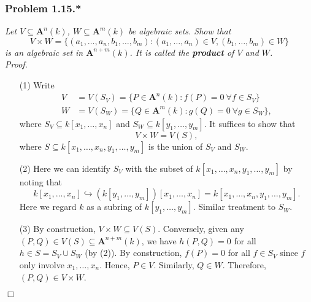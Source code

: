 \documentclass{article}
\begin{document}



\subsubsection*{Problem 1.15.*}
\emph{Let $V \subseteq \mathbf{A}^n(k)$, $W \subseteq \mathbf{A}^m(k)$ be algebraic sets.
Show that
\[
  V \times W
  = \{(a_1,\ldots,a_n,b_1,\ldots,b_m) : (a_1,\ldots,a_n) \in V, (b_1,\ldots,b_m) \in W \}
\]
is an algebraic set in $\mathbf{A}^{n+m}(k)$.
It is called the \textbf{product} of $V$ and $W$.} \\

\emph{Proof.}
\begin{enumerate}
\item[(1)]
  Write
  \begin{align*}
    V &= V(S_V) = \{ P \in \mathbf{A}^n(k) : f(P) = 0 \: \forall f \in S_V \} \\
    W &= V(S_W) = \{ Q \in \mathbf{A}^m(k) : g(Q) = 0 \: \forall g \in S_W \},
  \end{align*}
  where $S_V \subseteq k[x_1,\ldots,x_n]$ and $S_W \subseteq k[y_1,\ldots,y_m]$.
  It suffices to show that
  \[
    V \times W = V(S),
  \]
  where
  $S \subseteq k[x_1,\ldots,x_n,y_1,\ldots,y_m]$ is the union of $S_V$ and $S_W$.

\item[(2)]
  Here we can identify $S_V$ with the subset of
  $k[x_1,\ldots,x_n,y_1,\ldots,y_m]$
  by noting that
  \[
    k[x_1,\ldots,x_n]
    \hookrightarrow (k[y_1,\ldots,y_m])[x_1,\ldots,x_n]
    = k[x_1,\ldots,x_n,y_1,\ldots,y_m].
  \]
  Here we regard $k$ as a subring of $k[y_1,\ldots,y_m]$.
  Similar treatment to $S_W$.

\item[(3)]
  By construction, $V \times W \subseteq V(S)$.
  Conversely, given any $(P,Q) \in V(S) \subseteq \mathbf{A}^{n+m}(k)$,
  we have $h(P,Q) = 0$ for all $h \in S = S_V \cup S_W$ (by (2)).
  By construction, $f(P) = 0$ for all $f \in S_V$ since $f$ only involve $x_1,\ldots,x_n$.
  Hence, $P \in V$. Similarly, $Q \in W$. Therefore, $(P,Q) \in V \times W$.
\end{enumerate}
$\Box$ \\\\



\end{document}
